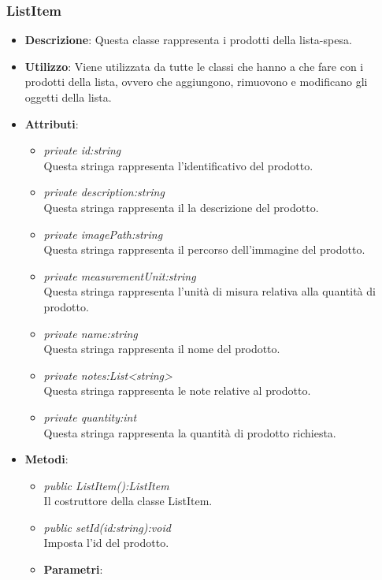 \subsubsection{ListItem}
\begin{itemize}
\item \textbf{Descrizione}: Questa classe rappresenta i prodotti della lista-spesa.
\item \textbf{Utilizzo}: Viene utilizzata da tutte le classi che hanno a che fare con i prodotti della lista, ovvero che aggiungono, rimuovono e modificano gli oggetti della lista.
\item \textbf{Attributi}: 
	\begin{itemize}
	\item \textit{private id:string}\\
		Questa stringa rappresenta l'identificativo del prodotto.
	\item \textit{private description:string}\\
	Questa stringa rappresenta il la descrizione del prodotto.
	\item \textit{private imagePath:string}\\
		Questa stringa rappresenta il percorso dell'immagine del prodotto.
	\item \textit{private measurementUnit:string}\\
	Questa stringa rappresenta l'unità di misura relativa alla quantità di prodotto.
	\item \textit{private name:string}\\
	Questa stringa rappresenta il nome del prodotto.
	\item \textit{private notes:List<string>}\\
	Questa stringa rappresenta le note relative al prodotto.
	\item \textit{private quantity:int}\\
	Questa stringa rappresenta la quantità di prodotto richiesta.
	\end{itemize}
\item \textbf{Metodi}:
	\begin{itemize}
	\item \textit{public ListItem():ListItem}\\
	Il costruttore della classe ListItem.
	\item \textit{public setId(id:string):void}\\
	Imposta l'id del prodotto.
				\item{\textbf{Parametri}: \begin{itemize}

\end{itemize}}
\end{itemize}
\end{itemize}

